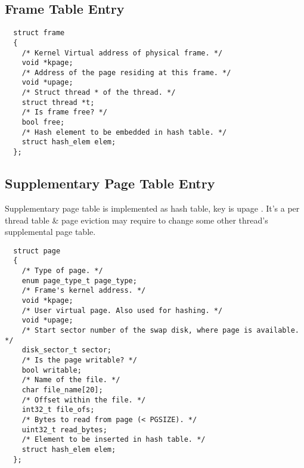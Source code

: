 \documentclass[a4,11pt]{article}
\begin{document}
\subsection{Frame Table Entry}
\begin{lstlisting}
  struct frame
  {
    /* Kernel Virtual address of physical frame. */
    void *kpage;
    /* Address of the page residing at this frame. */
    void *upage;
    /* Struct thread * of the thread. */
    struct thread *t;
    /* Is frame free? */
    bool free;
    /* Hash element to be embedded in hash table. */
    struct hash_elem elem;
  }; 
\end{lstlisting}

\subsection{Supplementary Page Table Entry}
Supplementary page table is implemented as hash table, key is upage .  It's a per thread table \& page eviction may require to   change some other thread's supplemental page table.
\begin{lstlisting}
  struct page
  {
    /* Type of page. */
    enum page_type_t page_type;
    /* Frame's kernel address. */
    void *kpage;
    /* User virtual page. Also used for hashing. */
    void *upage;
    /* Start sector number of the swap disk, where page is available. */
    disk_sector_t sector;
    /* Is the page writable? */
    bool writable;
    /* Name of the file. */
    char file_name[20];
    /* Offset within the file. */
    int32_t file_ofs;
    /* Bytes to read from page (< PGSIZE). */
    uint32_t read_bytes;
    /* Element to be inserted in hash table. */
    struct hash_elem elem;
  };
\end{lstlisting}
\end{document}
